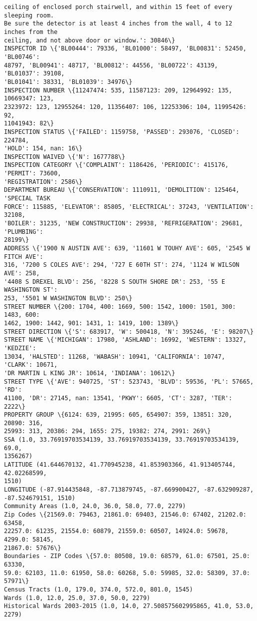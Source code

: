 \documentclass[11pt]{article}
\begin{document}
\begin{Verbatim}[commandchars=\\\{\}]
ceiling of enclosed porch stairwell, and within 15 feet of every sleeping room.
Be sure the detector is at least 4 inches from the wall, 4 to 12 inches from the
ceiling, and not above door or window.': 30846\}
INSPECTOR ID \{'BL00444': 79336, 'BL01000': 58497, 'BL00831': 52450, 'BL00746':
48797, 'BL00941': 48717, 'BL00812': 44556, 'BL00722': 43139, 'BL01037': 39108,
'BL01041': 38331, 'BL01039': 34976\}
INSPECTION NUMBER \{11247474: 535, 11587123: 209, 12964992: 135, 10669347: 123,
2323972: 123, 12955264: 120, 11356407: 106, 12253306: 104, 11995426: 92,
11041943: 82\}
INSPECTION STATUS \{'FAILED': 1159758, 'PASSED': 293076, 'CLOSED': 224784,
'HOLD': 154, nan: 16\}
INSPECTION WAIVED \{'N': 1677788\}
INSPECTION CATEGORY \{'COMPLAINT': 1186426, 'PERIODIC': 415176, 'PERMIT': 73600,
'REGISTRATION': 2586\}
DEPARTMENT BUREAU \{'CONSERVATION': 1110911, 'DEMOLITION': 125464, 'SPECIAL TASK
FORCE': 115885, 'ELEVATOR': 85805, 'ELECTRICAL': 37243, 'VENTILATION': 32108,
'BOILER': 31235, 'NEW CONSTRUCTION': 29938, 'REFRIGERATION': 29681, 'PLUMBING':
28199\}
ADDRESS \{'1900 N AUSTIN AVE': 639, '11601 W TOUHY AVE': 605, '2545 W FITCH AVE':
316, '7200 S COLES AVE': 294, '727 E 60TH ST': 274, '1124 W WILSON AVE': 258,
'4408 S DREXEL BLVD': 256, '8228 S SOUTH SHORE DR': 253, '55 E WASHINGTON ST':
253, '5501 W WASHINGTON BLVD': 250\}
STREET NUMBER \{200: 1704, 400: 1669, 500: 1542, 1000: 1501, 300: 1483, 600:
1462, 1900: 1442, 901: 1431, 1: 1419, 100: 1389\}
STREET DIRECTION \{'S': 683917, 'W': 500418, 'N': 395246, 'E': 98207\}
STREET NAME \{'MICHIGAN': 17980, 'ASHLAND': 16992, 'WESTERN': 13327, 'KEDZIE':
13034, 'HALSTED': 11268, 'WABASH': 10941, 'CALIFORNIA': 10747, 'CLARK': 10671,
'DR MARTIN L KING JR': 10614, 'INDIANA': 10612\}
STREET TYPE \{'AVE': 940725, 'ST': 523743, 'BLVD': 59536, 'PL': 57665, 'RD':
41100, 'DR': 27145, nan: 13541, 'PKWY': 6605, 'CT': 3287, 'TER': 2222\}
PROPERTY GROUP \{6124: 639, 21995: 605, 654907: 359, 13851: 320, 20890: 316,
25993: 313, 20386: 294, 1655: 275, 19382: 274, 2991: 269\}
SSA (1.0, 33.76919703534139, 33.76919703534139, 33.76919703534139, 69.0,
1356267)
LATITUDE (41.644670132, 41.770945238, 41.853903366, 41.913405744, 42.02268599,
1510)
LONGITUDE (-87.914435848, -87.713879745, -87.669900427, -87.632909287,
-87.524679151, 1510)
Community Areas (1.0, 24.0, 36.0, 58.0, 77.0, 2279)
Zip Codes \{21569.0: 79463, 21861.0: 69403, 21546.0: 67402, 21202.0: 63458,
22257.0: 61235, 21554.0: 60879, 21559.0: 60507, 14924.0: 59678, 4299.0: 58145,
21867.0: 57676\}
Boundaries - ZIP Codes \{57.0: 80508, 19.0: 68579, 61.0: 67501, 25.0: 63330,
59.0: 62103, 11.0: 61950, 58.0: 60268, 5.0: 59985, 32.0: 58309, 37.0: 57971\}
Census Tracts (1.0, 179.0, 374.0, 572.0, 801.0, 1545)
Wards (1.0, 12.0, 25.0, 37.0, 50.0, 2279)
Historical Wards 2003-2015 (1.0, 14.0, 27.508575602995865, 41.0, 53.0, 2279)
    \end{Verbatim}
\end{document}
